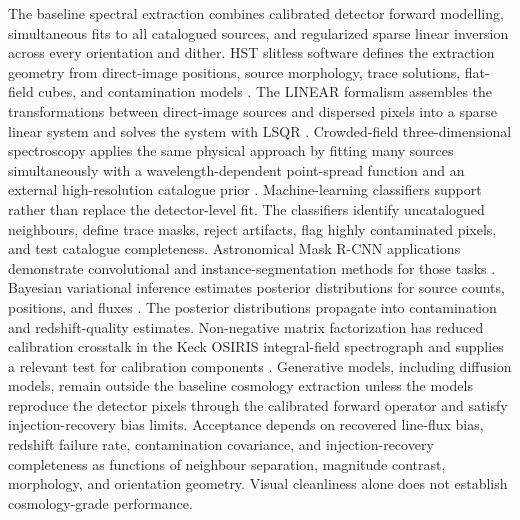 The baseline spectral extraction combines calibrated detector forward modelling, simultaneous fits to all catalogued sources, and regularized sparse linear inversion across every orientation and dither. HST slitless software defines the extraction geometry from direct-image positions, source morphology, trace solutions, flat-field cubes, and contamination models \cite{axe2009}. The LINEAR formalism assembles the transformations between direct-image sources and dispersed pixels into a sparse linear system and solves the system with LSQR \cite{linear2018}. Crowded-field three-dimensional spectroscopy applies the same physical approach by fitting many sources simultaneously with a wavelength-dependent point-spread function and an external high-resolution catalogue prior \cite{kamann2013,husser2016}. Machine-learning classifiers support rather than replace the detector-level fit. The classifiers identify uncatalogued neighbours, define trace masks, reject artifacts, flag highly contaminated pixels, and test catalogue completeness. Astronomical Mask R-CNN applications demonstrate convolutional and instance-segmentation methods for those tasks \cite{burke2019}. Bayesian variational inference estimates posterior distributions for source counts, positions, and fluxes \cite{liu2021}. The posterior distributions propagate into contamination and redshift-quality estimates. Non-negative matrix factorization has reduced calibration crosstalk in the Keck OSIRIS integral-field spectrograph and supplies a relevant test for calibration components \cite{horstman2022}. Generative models, including diffusion models, remain outside the baseline cosmology extraction unless the models reproduce the detector pixels through the calibrated forward operator and satisfy injection-recovery bias limits. Acceptance depends on recovered line-flux bias, redshift failure rate, contamination covariance, and injection-recovery completeness as functions of neighbour separation, magnitude contrast, morphology, and orientation geometry. Visual cleanliness alone does not establish cosmology-grade performance.

